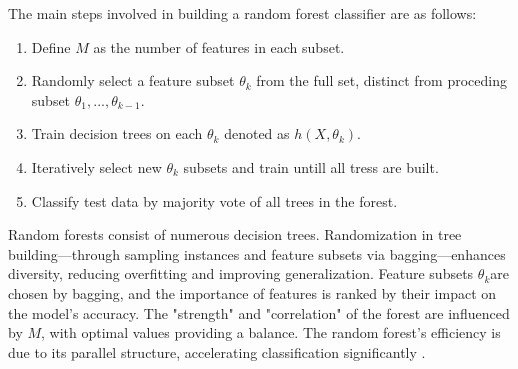             The main steps involved in building a random forest classifier are as follows:
           
            \begin{enumerate}
                \item Define $M$ as the number of features in each subset.
                \item Randomly select a feature subset $\theta_k$ from the full set, distinct from proceding subset $\theta_{1},..., \theta_{k-1}$.
                \item Train decision trees on each $\theta_k$ denoted as $h(X, \theta_k)$.
                \item Iteratively select new $\theta_k$ subsets and train untill all tress are built.
                \item Classify test data by majority vote of all trees in the forest.
            \end{enumerate}

            Random forests consist of numerous decision trees. Randomization in tree building—through sampling instances and feature subsets via bagging—enhances diversity, reducing overfitting and improving generalization. Feature subsets $\theta_k$​ are chosen by bagging, and the importance of features is ranked by their impact on the model's accuracy. The "strength" and "correlation" of the forest are influenced by $M$, with optimal values providing a balance. The random forest's efficiency is due to its parallel structure, accelerating classification significantly \cite{parmar_review_2019}.
            
